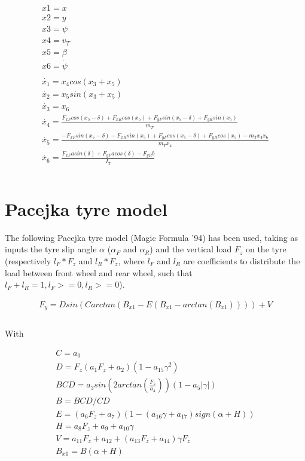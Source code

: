 \documentclass{report}
\let\Oldsection\section
\renewcommand{\section}{\FloatBarrier\Oldsection}
\begin{document}
\begin{equation}
\begin{aligned}
x1 = x\\
x2 = y\\
x3 = \psi\\
x4 = v_T\\
x5 = \beta\\
x6 = \dot{\psi}\\\\
\dot{x_1} = x_4 cos(x_3 + x_5)\\
\dot{x_2} = x_5 sin(x_3 + x_5)\\
\dot{x_3} = x_6 \\
\dot{x_4} = \frac{F_{xF} cos(x_5-\delta) + F_{xR} cos(x_5) + F_{yF} sin(x_5-\delta) + F_{yR} sin(x_5)}{m_T} \\
\dot{x_5} = \frac{-F_{xF} sin(x_5-\delta) - F_{xR} sin(x_5) + F_{yF} cos(x_5-\delta) + F_{yR} cos(x_5) - m_T x_4 x_6}{m_T x_4} \\
\dot{x_6} = \frac{F_{xF} a sin(\delta) + F_{yF} a cos(\delta) - F_{yR} b}{I_T} \\\\
\end{aligned}
\end{equation}

\section{Pacejka tyre model}

The following Pacejka tyre model (Magic Formula '94) has been used, taking as inputs the tyre slip angle $\alpha$ ($\alpha_F$ and $\alpha_R$) and the vertical load $F_z$ on the tyre (respectively $l_F*F_z$ and $l_R*F_z$, where $l_F$ and $l_R$ are coefficients to distribute the load between front wheel and rear wheel, such that $l_F+l_R=1, l_F>=0, l_R>=0$).

\begin{equation}
\begin{aligned}
F_y = D sin (C arctan (B_{x1} - E (B_{x1} - arctan(B_{x1})))) + V\\\\
\end{aligned}
\end{equation}

With

\begin{equation}
\begin{aligned}
C = a_0\\
D = F_z (a_1 F_z + a_2) (1 - a_{15} \gamma^2)\\
BCD = a_3 sin (2 arctan(\frac{F_z}{a_4})) (1 - a_5 |\gamma|)\\
B = BCD / CD\\
E = (a_6 F_z + a_7) (1 - (a_{16} \gamma + a_{17})sign(\alpha+H))\\
H = a_8 F_z + a_9 + a_{10} \gamma\\
V = a_{11}F_z + a_{12} + (a_{13} F_z + a_{14}) \gamma F_z\\
B_{x1} = B (\alpha + H)\\\\
\end{aligned}
\end{equation}
\end{document}
